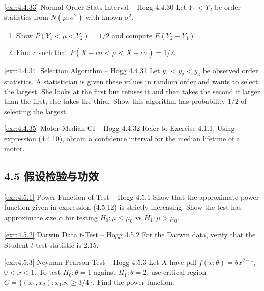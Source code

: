 \begin{exercise}{\ref{exr:4.4.33} Normal Order Stats Interval – Hogg 4.4.30}\label{exr:4.4.33}
Let $Y_1 < Y_2$ be order statistics from $N(\mu,\sigma^2)$ with known $\sigma^2$.
\begin{enumerate}
\item[(a)] Show $P(Y_1 < \mu < Y_2) = 1/2$ and compute $E(Y_2-Y_1)$.
\item[(b)] Find $c$ such that $P(\overline{X}-c\sigma < \mu < \overline{X}+c\sigma) = 1/2$.
\end{enumerate}
\end{exercise}

\begin{exercise}{\ref{exr:4.4.34} Selection Algorithm – Hogg 4.4.31}\label{exr:4.4.34}
Let $y_1 < y_2 < y_3$ be observed order statistics. A statistician is given these values in random order and wants to select the largest. She looks at the first but refuses it and then takes the second if larger than the first, else takes the third. Show this algorithm has probability $1/2$ of selecting the largest.
\end{exercise}

\begin{exercise}{\ref{exr:4.4.35} Motor Median CI – Hogg 4.4.32}\label{exr:4.4.35}
Refer to Exercise 4.1.1. Using expression (4.4.10), obtain a confidence interval for the median lifetime of a motor.
\end{exercise}

\subsection{4.5 假设检验与功效}\label{sec:exercises-4.5}

\begin{exercise}{\ref{exr:4.5.1} Power Function of Test – Hogg 4.5.1}\label{exr:4.5.1}
Show that the approximate power function given in expression (4.5.12) is strictly increasing. Show the test has approximate size $\alpha$ for testing $H_0: \mu \leq \mu_0$ vs $H_1: \mu > \mu_0$.
\end{exercise}

\begin{exercise}{\ref{exr:4.5.2} Darwin Data t-Test – Hogg 4.5.2}\label{exr:4.5.2}
For the Darwin data, verify that the Student $t$-test statistic is 2.15.
\end{exercise}

\begin{exercise}{\ref{exr:4.5.3} Neyman-Pearson Test – Hogg 4.5.3}\label{exr:4.5.3}
Let $X$ have pdf $f(x;\theta) = \theta x^{\theta-1}$, $0<x<1$. To test $H_0: \theta=1$ against $H_1: \theta=2$, use critical region $C=\{(x_1,x_2): x_1x_2 \geq 3/4\}$. Find the power function.
\end{exercise}

